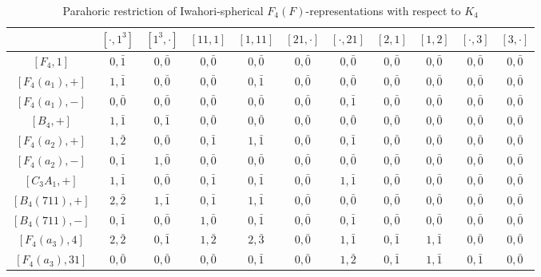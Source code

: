     \begin{table}[!ht]
        \centering
        \caption{Parahoric restriction of Iwahori-spherical $F_4(F)$-representations with respect to $K_4$} \label{tbl:F4_K4_1}
        \begin{adjustbox}{max width=\linewidth}
        \begin{tabular}{|c|cccccccccc|}
            \hline
        & $[\cdot,1^3]$ & $[1^3,\cdot]$ & $[11,1]$ & $[1,11]$ & $[21,\cdot]$ & $[\cdot,21]$ & $[2,1]$ & $[1,2]$ & $[\cdot, 3]$ & $[3,\cdot]$ \\\hline
        $[F_4,1]$ & $0,\bar1$ & $0,\bar0$ & $0,\bar0$ & $0,\bar0$ & $0,\bar0$ & $0,\bar0$ & $0,\bar0$ & $0,\bar0$ & $0,\bar0$ & $0,\bar0$ \\\hline
        $[F_4(a_1),+]$ & $1,\bar1$ & $0,\bar0$ & $0,\bar0$ & $0,\bar1$ & $0,\bar0$ & $0,\bar0$ & $0,\bar0$ & $0,\bar0$ & $0,\bar0$ & $0,\bar0$ \\
        $[F_4(a_1),-]$ & $0,\bar0$ & $0,\bar0$ & $0,\bar0$ & $0,\bar0$ & $0,\bar0$ & $0,\bar1$ & $0,\bar0$ & $0,\bar0$ & $0,\bar0$ & $0,\bar0$ \\
        $[B_4,+]$ & $1,\bar1$ & $0,\bar1$ & $0,\bar0$ & $0,\bar0$ & $0,\bar0$ & $0,\bar0$ & $0,\bar0$ & $0,\bar0$ & $0,\bar0$ & $0,\bar0$ \\\hline
        $[F_4(a_2),+]$ & $1,\bar2$ & $0,\bar0$ & $0,\bar1$ & $1,\bar1$ & $0,\bar0$ & $0,\bar1$ & $0,\bar0$ & $0,\bar0$ & $0,\bar0$ & $0,\bar0$ \\
        $[F_4(a_2),-]$ & $0,\bar1$ & $1,\bar0$ & $0,\bar0$ & $0,\bar0$ & $0,\bar0$ & $0,\bar0$ & $0,\bar0$ & $0,\bar0$ & $0,\bar0$ & $0,\bar0$ \\
        $[C_3A_1,+]$ & $1,\bar1$ & $0,\bar0$ & $0,\bar1$ & $0,\bar1$ & $0,\bar0$ & $1,\bar1$ & $0,\bar0$ & $0,\bar0$ & $0,\bar0$ & $0,\bar0$ \\\hline
        $[B_4(711),+]$ & $2,\bar2$ & $1,\bar1$ & $0,\bar1$ & $1,\bar1$ & $0,\bar0$ & $0,\bar0$ & $0,\bar0$ & $0,\bar0$ & $0,\bar0$ & $0,\bar0$ \\
        $[B_4(711),-]$ & $0,\bar1$ & $0,\bar0$ & $1,\bar0$ & $0,\bar1$ & $0,\bar0$ & $0,\bar1$ & $0,\bar0$ & $0,\bar0$ & $0,\bar0$ & $0,\bar0$ \\\hline
        $[F_4(a_3),4]$ & $2,\bar2$ & $0,\bar1$ & $1,\bar2$ & $2,\bar{3}$ & $0,\bar0$ & $1,\bar1$ & $0,\bar1$ & $1,\bar1$ & $0,\bar0$ & $0,\bar0$ \\
        $[F_4(a_3),31]$ & $0,\bar0$ & $0,\bar0$ & $0,\bar0$ & $0,\bar1$ & $0,\bar0$ & $1,\bar2$ & $0,\bar1$ & $1,\bar1$ & $0,\bar1$ & $0,\bar0$ \\

\end{tabular}
\end{adjustbox}
\end{table}
